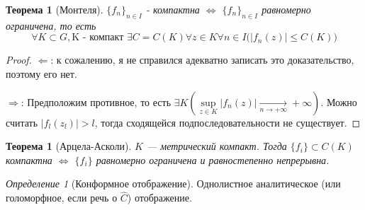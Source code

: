 \documentclass[12pt]{article}
\newcommand{\Ra}{\Rightarrow}
\newcommand{\La}{\Leftarrow}
\renewcommand{\iff}{\Leftrightarrow}
\newcounter{cnt}
\theoremstyle{thmnote}
\newtheorem{theorem}[cnt]{Теорема}
\theoremstyle{remark}
\theoremstyle{defnote}
\newtheorem{definition}[cnt]{Определение}
\begin{document}
\begin{theorem}[Монтеля]
\label{montel}
    $\{f_n\}_{n \in I}$ - компактна $\iff$ $\{f_n\}_{n \in I}$ равномерно ограничена, то есть
    \begin{equation*}
        \forall K \subset G, \text{K - компакт } \exists C = C(K) \forall z \in K \forall n \in I \big( |f_n(z)| \leq C(K) \big)
    \end{equation*}
\end{theorem}
\begin{proof}
    $\La$: к сожалению, я не справился адекватно записать это доказательство, поэтому его нет.

    $\Ra$: Предположим противное, то есть $\exists K \left( \underset{z \in K}{\sup} |f_n(z)| \underset{n \to +\infty}{\longrightarrow} +\infty \right)$. Можно считать $|f_l(z_l)| > l$, тогда сходящейся подпоследовательности не существует.
\end{proof}

\begin{theorem}[Арцела-Асколи]
    $K$ --- метрический компакт. Тогда $\{f_i\} \subset C(K)$ компактна $\iff$ $\{f_i\}$ равномерно ограничена и равностепенно непрерывна.
\end{theorem}

\begin{definition}[Конформное отображение]
    Однолистное аналитическое (или голоморфное, если речь о $\hat{C}$) отображение.
\end{definition}
\end{document}
